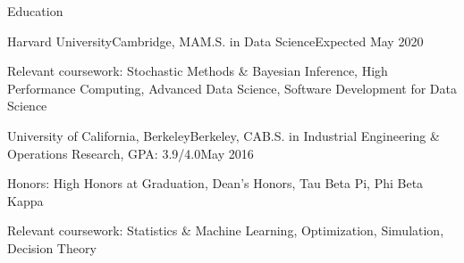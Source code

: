 \documentclass{resume} %
\begin{document}

\begin{rSection}{Education}

\begin{rSubsection}{Harvard University}{Cambridge, MA}{M.S. in Data Science}{Expected May 2020}
\item Relevant coursework: Stochastic Methods \& Bayesian Inference, High Performance Computing, Advanced Data Science, Software Development for Data Science
\end{rSubsection}


\begin{rSubsection}{University of California, Berkeley}{Berkeley, CA}{B.S. in Industrial Engineering \& Operations Research, GPA: 3.9/4.0}{May 2016}
\item Honors: High Honors at Graduation, Dean's Honors, Tau Beta Pi, Phi Beta Kappa
\item Relevant coursework: Statistics \& Machine Learning, Optimization, Simulation, Decision Theory
\end{rSubsection}


\end{rSection}

\end{document}

